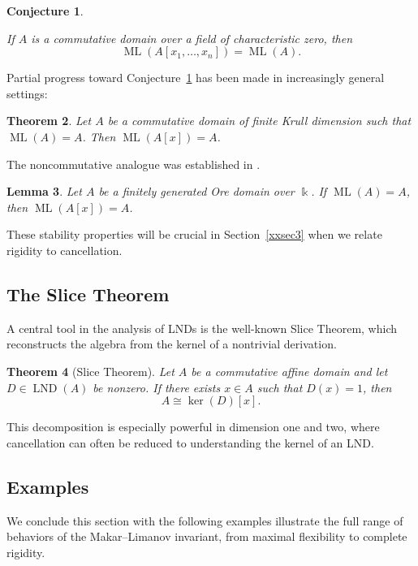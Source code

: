 \documentclass{amsart}
\theoremstyle{plain}
\newtheorem{theorem}{Theorem}
\newtheorem{lemma}[theorem]{Lemma}
\newtheorem{conjecture}[theorem]{Conjecture}
\numberwithin{theorem}{section}
\numberwithin{equation}{theorem}
\theoremstyle{definition}
\DeclareMathOperator{\LND}{LND}
\DeclareMathOperator{\ML}{ML}
\begin{document}
\begin{conjecture}\label{conj:ML-stability}

If $A$ is a commutative domain over a field of characteristic zero, then
\[
    \ML(A[x_1,\dots,x_n]) = \ML(A).
\]
\end{conjecture}

Partial progress toward Conjecture~\ref{conj:ML-stability} has been made in increasingly general settings:

\begin{theorem}\cite[Lemma 21]{ML}
\label{thm:MLstablecomm}
Let $A$ be a commutative domain of finite Krull dimension such that $\ML(A)=A$.  
Then $\ML(A[x])=A$.
\end{theorem}

The noncommutative analogue was established in \cite{BellZhang2017}.

\begin{lemma}\cite[Lemma 3.5]{BellZhang2017}
\label{lemma:MLstablenoncomm}
Let $A$ be a finitely generated Ore domain over $\Bbbk$.  
If $\ML(A)=A$, then $\ML(A[x])=A$.
\end{lemma}

These stability properties will be crucial in Section~\ref{xxsec3} when we relate rigidity to cancellation.

\subsection{The Slice Theorem}

A central tool in the analysis of LNDs is the well-known Slice Theorem, which reconstructs the algebra from the kernel of a nontrivial derivation.

\begin{theorem}[Slice Theorem]\cite[Corollary 1.22]{Freudenburg2006}
\label{thm:slice}
Let $A$ be a commutative affine domain and let $D\in \LND(A)$ be nonzero.  
If there exists $x\in A$ such that $D(x)=1$, then
\[
A \cong \ker(D)[x].
\]
\end{theorem}

This decomposition is especially powerful in dimension one and two, where cancellation can often be reduced to understanding the kernel of an LND.


\subsection{Examples}

We conclude this section with  the following examples illustrate the full range of behaviors of the
Makar--Limanov invariant, from maximal flexibility to complete rigidity.
\end{document}
